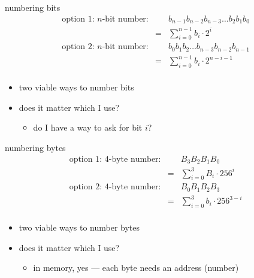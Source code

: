 
\begin{frame}{numbering bits}
\begin{eqnarray*}
\text{option 1: $n$-bit number:}&\;&b_{n-1}b_{n-2}b_{n-3}\ldots b_2b_1b_0 \\
    & = & \sum_{i=0}^{n-1} b_i \cdot 2^i \\
\text{option 2: $n$-bit number:}&\;&b_{0}b_{1}b_{2}\ldots b_{n-3}b_{n-2}b_{n-1} \\
    & = & \sum_{i=0}^{n-1} b_i \cdot 2^{n-i-1} \\
\end{eqnarray*}
\begin{itemize}
\item<2-> two viable ways to number bits
\item<3-> does it matter which I use?
    \begin{itemize}
    \item do I have a way to ask for bit $i$?
    \end{itemize}
\end{itemize}
\end{frame}

\begin{frame}{numbering bytes}
\begin{eqnarray*}
\text{option 1: 4-byte number:}&\;&B_3B_2B_1B_0 \\
    & = & \sum_{i=0}^{3} B_i \cdot 256^i \\
\text{option 2: 4-byte number:}&\;&B_0B_1B_2B_3 \\
    & = & \sum_{i=0}^{3} b_i \cdot 256^{3-i} \\
\end{eqnarray*}
\begin{itemize}
\item<2-> two viable ways to number bytes
\item<3-> does it matter which I use?
    \begin{itemize}
    \item in memory, yes --- each byte needs an address (number)
    \end{itemize}
\end{itemize}
\end{frame}

